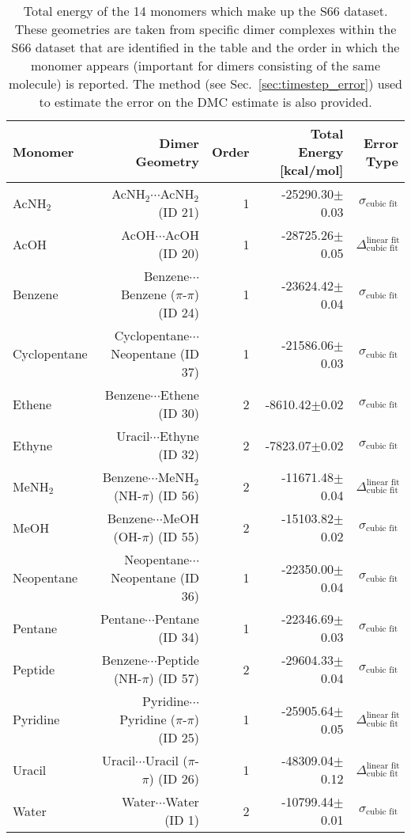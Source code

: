 \begin{table}
\caption{\label{tab:monomer_tot_ene}Total energy of the 14 monomers which make up the S66 dataset. These geometries are taken from specific dimer complexes within the S66 dataset that are identified in the table and the order in which the monomer appears (important for dimers consisting of the same molecule) is reported. The method (see Sec.~\ref{sec:timestep_error}) used to estimate the error on the DMC estimate is also provided.}
\begin{adjustbox}{center}
\begin{tabular}{lrrrr}
\toprule
Monomer & Dimer Geometry & Order & Total Energy [kcal/mol] & Error Type \\ 
\midrule
AcNH$_2$ & AcNH$_2$$\cdots$AcNH$_2$ (ID 21) & 1 & -25290.30$\pm$0.03 & $\sigma_\text{cubic fit}$ \\
AcOH & AcOH$\cdots$AcOH (ID 20) & 1 & -28725.26$\pm$0.05 & $\Delta_\text{cubic fit}^\text{linear fit}$ \\
Benzene & Benzene$\cdots$Benzene ($\pi$-$\pi$) (ID 24) & 1 & -23624.42$\pm$0.04 & $\sigma_\text{cubic fit}$ \\
Cyclopentane & Cyclopentane$\cdots$Neopentane (ID 37) & 1 & -21586.06$\pm$0.03 & $\sigma_\text{cubic fit}$ \\
Ethene & Benzene$\cdots$Ethene (ID 30) & 2 & -8610.42$\pm$0.02 & $\sigma_\text{cubic fit}$ \\
Ethyne & Uracil$\cdots$Ethyne (ID 32) & 2 & -7823.07$\pm$0.02 & $\sigma_\text{cubic fit}$ \\
MeNH$_2$ & Benzene$\cdots$MeNH$_2$ (NH-$\pi$) (ID 56) & 2 & -11671.48$\pm$0.04 & $\Delta_\text{cubic fit}^\text{linear fit}$ \\
MeOH & Benzene$\cdots$MeOH (OH-$\pi$) (ID 55) & 2 & -15103.82$\pm$0.02 & $\sigma_\text{cubic fit}$ \\
Neopentane & Neopentane$\cdots$Neopentane (ID 36) & 1 & -22350.00$\pm$0.04 & $\sigma_\text{cubic fit}$ \\
Pentane & Pentane$\cdots$Pentane (ID 34) & 1 & -22346.69$\pm$0.03 & $\sigma_\text{cubic fit}$ \\
Peptide & Benzene$\cdots$Peptide (NH-$\pi$) (ID 57) & 2 & -29604.33$\pm$0.04 & $\sigma_\text{cubic fit}$ \\
Pyridine & Pyridine$\cdots$Pyridine ($\pi$-$\pi$) (ID 25) & 1 & -25905.64$\pm$0.05 & $\Delta_\text{cubic fit}^\text{linear fit}$ \\
Uracil & Uracil$\cdots$Uracil ($\pi$-$\pi$) (ID 26) & 1 & -48309.04$\pm$0.12 & $\Delta_\text{cubic fit}^\text{linear fit}$ \\
Water & Water$\cdots$Water (ID 1) & 2 & -10799.44$\pm$0.01 & $\sigma_\text{cubic fit}$ \\
\bottomrule
\end{tabular}
\end{adjustbox}
\end{table}